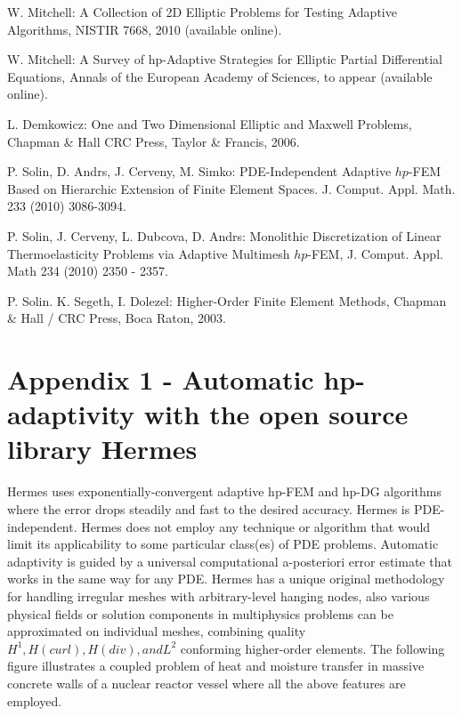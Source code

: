 \documentclass[12pt]{elsarticle}
\begin{document}
\begin{thebibliography}{[KLR73]}

W. Mitchell: A Collection of 2D Elliptic Problems for
Testing Adaptive Algorithms, NISTIR 7668, 2010 (available online).

W. Mitchell: A Survey of hp-Adaptive Strategies for Elliptic Partial Differential Equations,
Annals of the European Academy of Sciences, to appear (available online).

L. Demkowicz: One and Two Dimensional Elliptic and Maxwell Problems,
Chapman \& Hall \/ CRC Press, Taylor \& Francis, 2006.


P. Solin, D. Andrs, J. Cerveny, M. Simko:
PDE-Independent Adaptive $hp$-FEM Based on Hierarchic Extension of Finite Element Spaces.
J. Comput. Appl. Math. 233 (2010) 3086-3094.

P. Solin, J. Cerveny, L. Dubcova, D. Andrs:
Monolithic Discretization of Linear Thermoelasticity Problems
via Adaptive Multimesh $hp$-FEM, J. Comput. Appl. Math 234 (2010) 2350 - 2357.

P. Solin. K. Segeth, I. Dolezel: Higher-Order Finite Element Methods, Chapman \& Hall
/ CRC Press, Boca Raton, 2003.
\end{thebibliography}

\section{Appendix 1 - Automatic hp-adaptivity with the open source library Hermes}

Hermes uses exponentially-convergent adaptive hp-FEM and hp-DG algorithms where the error drops steadily and fast to the desired accuracy.
Hermes is PDE-independent. Hermes does not employ any technique or algorithm that would limit its applicability to some particular class(es) of PDE problems. Automatic adaptivity is guided by a universal computational a-posteriori error estimate that works in the same way for any PDE.
Hermes has a unique original methodology for handling irregular meshes with arbitrary-level hanging nodes, also various physical fields or solution components in multiphysics problems can be approximated on individual meshes, combining quality $H^1, H(curl), H(div), and L^2$ conforming higher-order elements. The following figure illustrates a coupled problem of heat and moisture transfer in massive concrete walls of a nuclear reactor vessel where all the above features are employed.
\end{document}
